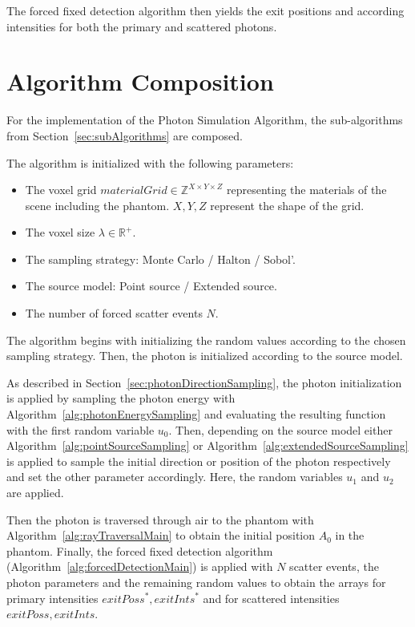 The forced fixed detection algorithm then yields the exit positions and
according intensities for both the primary and scattered photons.


\section{Algorithm Composition}
\label{sec:algorithmComposition}

For the implementation of the Photon Simulation Algorithm, the sub-algorithms from Section~\ref{sec:subAlgorithms} are composed.

The algorithm is initialized with the following parameters:
\begin{itemize}
    \item The voxel grid $materialGrid \in \mathbb{Z}^{X \times Y \times Z}$
    representing the materials of the scene including the phantom. $X,Y,Z$ represent
    the shape of the grid.
    \item The voxel size $\lambda \in \mathbb{R}^+$.
    \item The sampling strategy: Monte Carlo / Halton / Sobol'.
    \item The source model: Point source / Extended source.
    \item The number of forced scatter events $N$.
\end{itemize}

The algorithm begins with initializing the random values according to the chosen sampling strategy. Then, the photon is initialized according to the source model.

As described in Section~\ref{sec:photonDirectionSampling}, the photon
initialization is applied by sampling the photon energy with
Algorithm~\ref{alg:photonEnergySampling} and evaluating the resulting function
with the first random variable $u_0$. Then, depending on the source model either
Algorithm~\ref{alg:pointSourceSampling} or
Algorithm~\ref{alg:extendedSourceSampling} is applied to sample the initial
direction or position of the photon respectively and set the other parameter
accordingly. Here, the random variables $u_1$ and $u_2$ are applied.

Then the photon is traversed through air to the phantom with Algorithm~\ref{alg:rayTraversalMain} to obtain the initial position $A_0$ in the phantom. Finally, the forced fixed detection algorithm (Algorithm~\ref{alg:forcedDetectionMain}) is applied with $N$ scatter events, the photon parameters and the remaining random values to obtain the arrays for primary intensities $exitPoss^*, exitInts^*$ and for scattered intensities $exitPoss, exitInts$.

